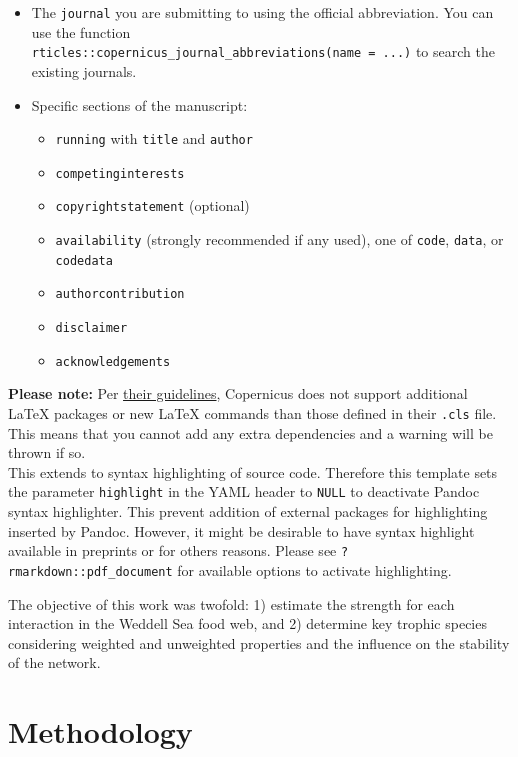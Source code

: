 \documentclass[gc, manuscript]{copernicus}
\begin{document}
\begin{itemize}
\item
  The \texttt{journal} you are submitting to using the official
  abbreviation. You can use the function
  \texttt{rticles::copernicus\_journal\_abbreviations(name\ =\ \textquotesingle{}...\textquotesingle{})}
  to search the existing journals.
\item
  Specific sections of the manuscript:

  \begin{itemize}
  \item
    \texttt{running} with \texttt{title} and \texttt{author}
  \item
    \texttt{competinginterests}
  \item
    \texttt{copyrightstatement} (optional)
  \item
    \texttt{availability} (strongly recommended if any used), one of
    \texttt{code}, \texttt{data}, or \texttt{codedata}
  \item
    \texttt{authorcontribution}
  \item
    \texttt{disclaimer}
  \item
    \texttt{acknowledgements}
  \end{itemize}
\end{itemize}

\textbf{Please note:} Per
\href{https://publications.copernicus.org/for_authors/manuscript_preparation.html}{their
guidelines}, Copernicus does not support additional \LaTeX{} packages or
new \LaTeX{} commands than those defined in their \texttt{.cls} file.
This means that you cannot add any extra dependencies and a warning will
be thrown if so.\\
This extends to syntax highlighting of source code. Therefore this
template sets the parameter \texttt{highlight} in the YAML header to
\texttt{NULL} to deactivate Pandoc syntax highlighter. This prevent
addition of external packages for highlighting inserted by Pandoc.
However, it might be desirable to have syntax highlight available in
preprints or for others reasons. Please see
\texttt{?rmarkdown::pdf\_document} for available options to activate
highlighting.

The objective of this work was twofold: 1) estimate the strength for
each interaction in the Weddell Sea food web, and 2) determine key
trophic species considering weighted and unweighted properties and the
influence on the stability of the network.

\section{Methodology}
\end{document}
